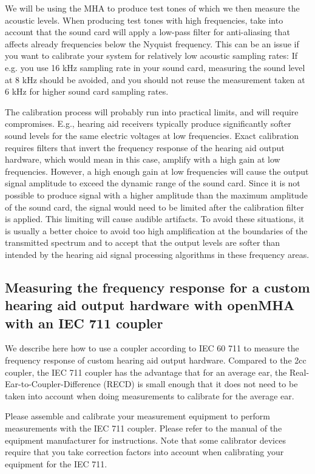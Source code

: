 \documentclass[11pt,a4paper,twoside]{article}
\newcommand{\+}{\discretionary{\mbox{\scriptsize$\hookleftarrow$}}{}{}}
\begin{document}
We will be using the MHA to produce test tones of which we then
measure the acoustic levels.
%
When producing test tones with high frequencies, take into account
that the sound card will apply a low-pass filter for anti-aliasing
that affects already frequencies below the Nyquist frequency.
%
This can be an issue if you want to calibrate your system for
relatively low acoustic sampling rates: If e.g. you use 16 kHz
sampling rate in your sound card, measuring the sound level at 8 kHz
should be avoided, and you should not reuse the measurement taken at 6
kHz for higher sound card sampling rates.

The calibration process will probably run into practical limits, and
will require compromises.
%
E.g., hearing aid receivers typically produce significantly softer
sound levels for the same electric voltages at low frequencies.
%
Exact calibration requires filters that invert the frequency response
of the hearing aid output hardware, which would mean in this case,
amplify with a high gain at low frequencies.
%
However, a high enough gain at low frequencies will cause the output
signal amplitude to exceed the dynamic range of the sound card.
%
Since it is not possible to produce signal with a higher amplitude
than the maximum amplitude of the sound card, the signal would need to
be limited after the calibration filter is applied. This limiting will
cause audible artifacts.
%
To avoid these situations, it is usually a better choice to avoid too
high amplification at the boundaries of the transmitted spectrum and
to accept that the output levels are softer than intended by the
hearing aid signal processing algorithms in these frequency areas.

\subsection{Measuring the frequency response for a custom hearing aid output hardware with openMHA with an IEC 711 coupler}

We describe here how to use a coupler according to IEC 60 711 to
measure the frequency response of custom hearing aid output hardware.
%
Compared to the 2cc coupler, the IEC 711 coupler has the advantage
that for an average ear, the Real-Ear-to-Coupler-Difference (RECD) is
small enough that it does not need to be taken into account when doing
measurements to calibrate for the average ear.

Please assemble and calibrate your measurement equipment to perform
measurements with the IEC 711 coupler.
%
Please refer to the manual of the equipment manufacturer for
instructions.
%
Note that some calibrator devices require that you take correction
factors into account when calibrating your equipment for the IEC 711.
\end{document}
